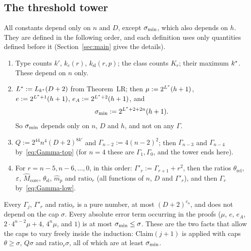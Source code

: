 \subsection{The threshold tower}
All constants depend only on $n$ and $D$, except $\sigma_{\min}$, which also depends on $h$. They are defined in the
following order, and each definition uses only quantities defined before it (Section~\ref{sec:main} gives the
details).
\begin{enumerate}[label=(T\arabic*),leftmargin=2.6em]
\item Type counts $k'$, $k_c(r)$, $k_{\mathrm{sl}}(r,p)$; the class counts $K_r$; their maximum $k^{\ast}$. These
  depend on $n$ only.
\item $L^{\ast}:=L_{k^{\ast}}(D+2)$ from Theorem~LR; then $\mu:=2^{L^{\ast}}(h+1)$, $e:=2^{L^{\ast}+1}(h+1)$,
  $e_A:=2^{L^{\ast}+2}(h+1)$, and
  \[\sigma_{\min}:=2^{L^{\ast}+2+2n}(h+1).\]
  So $\sigma_{\min}$ depends only on $n$, $D$ and $h$, and not on any $\Gamma$.
\item $Q:=2^{44}n^4(D+2)^{8k'}$ and $\Gamma_{n-2}:=4(n-2)^2$; then $\Gamma_{n-3}$ and $\Gamma_{n-4}$
  by~\eqref{eq:Gamma-top} (for $n=4$ these are $\Gamma_1,\Gamma_0$, and the tower ends here).
\item For $r=n-5,n-6,\dots,0$, in this order: $\Gamma'_r:=\Gamma_{r+1}+r^2$, then the ratios
  $\theta_{\mathrm{rel}}$, $\varepsilon$, $\hat M_{\mathrm{core}}$, $\theta_{\mathrm{sl}}$, $\hat m_p$ and ${\mathrm{ratio}}_r$ (all
  functions of $n$, $D$ and $\Gamma'_r$), and then $\Gamma_r$ by~\eqref{eq:Gamma-low}.
\end{enumerate}
Every $\Gamma_j$, $\Gamma'_r$ and ${\mathrm{ratio}}_r$ is a pure number, at most $(D+2)^{c_n}$, and does not depend
on the cap $\sigma$. Every absolute error term occurring in the proofs ($\mu$, $e$, $e_A$, $2\cdot 4^{n-2}\mu+4$,
$4^n\mu$, and $1$) is at most $\sigma_{\min}\le\sigma$. These are the two facts that allow the caps to vary freely
inside the induction: Claim$(j+1)$ is applied with caps $\theta\ge\sigma$, $Q\sigma$ and
${\mathrm{ratio}}_r\sigma$, all of which are at least $\sigma_{\min}$.
